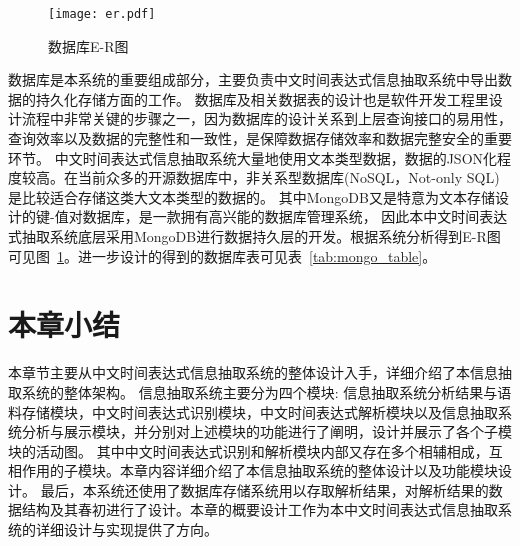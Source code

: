\begin{figure}[h]
  \centering
  \texttt{[image: er.pdf]}
  \caption{数据库E-R图}
  \label{fig:er_graph}
\end{figure}

数据库是本系统的重要组成部分，主要负责中文时间表达式信息抽取系统中导出数据的持久化存储方面的工作。
数据库及相关数据表的设计也是软件开发工程里设计流程中非常关键的步骤之一，因为数据库的设计关系到上层查询接口的易用性，查询效率以及数据的完整性和一致性，是保障数据存储效率和数据完整安全的重要环节。
中文时间表达式信息抽取系统大量地使用文本类型数据，数据的JSON化程度较高。在当前众多的开源数据库中，非关系型数据库(NoSQL，Not-only SQL)是比较适合存储这类大文本类型的数据的。
其中MongoDB又是特意为文本存储设计的键-值对数据库，是一款拥有高兴能的数据库管理系统，
因此本中文时间表达式抽取系统底层采用MongoDB进行数据持久层的开发。根据系统分析得到E-R图可见图~\ref{fig:er_graph}。进一步设计的得到的数据库表可见表~\ref{tab:mongo_table}。

\section{本章小结}

本章节主要从中文时间表达式信息抽取系统的整体设计入手，详细介绍了本信息抽取系统的整体架构。
信息抽取系统主要分为四个模块: 信息抽取系统分析结果与语料存储模块，中文时间表达式识别模块，中文时间表达式解析模块以及信息抽取系统分析与展示模块，并分别对上述模块的功能进行了阐明，设计并展示了各个子模块的活动图。
其中中文时间表达式识别和解析模块内部又存在多个相辅相成，互相作用的子模块。本章内容详细介绍了本信息抽取系统的整体设计以及功能模块设计。
最后，本系统还使用了数据库存储系统用以存取解析结果，对解析结果的数据结构及其春初进行了设计。本章的概要设计工作为本中文时间表达式信息抽取系统的详细设计与实现提供了方向。

